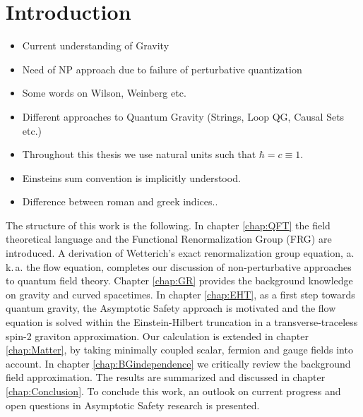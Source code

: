 \chapter{Introduction}
\begin{itemize}
	\item Current understanding of Gravity
	\item Need of NP approach due to failure of perturbative quantization
	\item Some words on Wilson, Weinberg etc.
	\item Different approaches to Quantum Gravity (Strings, Loop QG, Causal Sets etc.)
	\item Throughout this thesis we use natural units such that $\hbar = c  \equiv 1$.
	\item Einsteins sum convention is implicitly understood.
	\item Difference between roman and greek indices..
\end{itemize}

The structure of this work is the following. In chapter \ref{chap:QFT} the field theoretical language and the Functional Renormalization Group (FRG) are introduced. A derivation of Wetterich's exact renormalization group equation, a.\,k.\,a. the flow equation,  completes our discussion of non-perturbative approaches to quantum field theory. Chapter \ref{chap:GR} provides the background knowledge on gravity and curved spacetimes. In chapter \ref{chap:EHT}, as a first step towards quantum gravity, the Asymptotic Safety approach is motivated and the flow equation is solved within the Einstein-Hilbert truncation in a transverse-traceless spin-2 graviton approximation. Our calculation is extended in chapter \ref{chap:Matter}, by taking minimally coupled scalar, fermion and gauge fields into account. In chapter \ref{chap:BGindependence} we critically review the background field approximation.
The results are summarized and discussed in chapter \ref{chap:Conclusion}. To conclude this work, an outlook on current progress and open questions in Asymptotic Safety research is presented.
